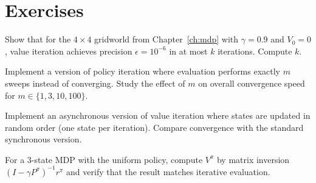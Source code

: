 \section{Exercises}

\begin{exercise}
Show that for the $4 \times 4$ gridworld from Chapter~\ref{ch:mdp} with
$\gamma = 0.9$ and $V_0 = 0$, value iteration achieves precision
$\epsilon = 10^{-6}$ in at most $k$ iterations. Compute $k$.
\end{exercise}

\begin{exercise}
Implement a version of policy iteration where evaluation performs exactly $m$
sweeps instead of converging. Study the effect of $m$ on overall convergence
speed for $m \in \{1, 3, 10, 100\}$.
\end{exercise}

\begin{exercise}
Implement an asynchronous version of value iteration where states are updated
in random order (one state per iteration). Compare convergence with the
standard synchronous version.
\end{exercise}

\begin{exercise}
For a 3-state MDP with the uniform policy, compute $V^\pi$ by matrix inversion
$(I - \gamma P^\pi)^{-1} r^\pi$ and verify that the result matches iterative
evaluation.
\end{exercise}
